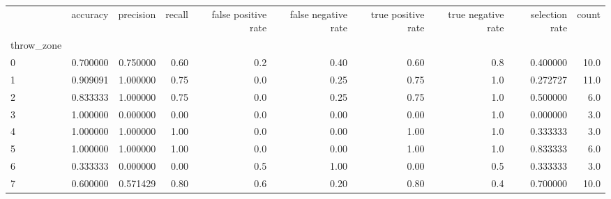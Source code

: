 \begin{tabular}{lrrrrrrrrr}
\toprule
{} &  accuracy &  precision &  recall &  false positive rate &  false negative rate &  true positive rate &  true negative rate &  selection rate &  count \\
throw\_zone &           &            &         &                      &                      &                     &                     &                 &        \\
\midrule
0          &  0.700000 &   0.750000 &    0.60 &                  0.2 &                 0.40 &                0.60 &                 0.8 &        0.400000 &   10.0 \\
1          &  0.909091 &   1.000000 &    0.75 &                  0.0 &                 0.25 &                0.75 &                 1.0 &        0.272727 &   11.0 \\
2          &  0.833333 &   1.000000 &    0.75 &                  0.0 &                 0.25 &                0.75 &                 1.0 &        0.500000 &    6.0 \\
3          &  1.000000 &   0.000000 &    0.00 &                  0.0 &                 0.00 &                0.00 &                 1.0 &        0.000000 &    3.0 \\
4          &  1.000000 &   1.000000 &    1.00 &                  0.0 &                 0.00 &                1.00 &                 1.0 &        0.333333 &    3.0 \\
5          &  1.000000 &   1.000000 &    1.00 &                  0.0 &                 0.00 &                1.00 &                 1.0 &        0.833333 &    6.0 \\
6          &  0.333333 &   0.000000 &    0.00 &                  0.5 &                 1.00 &                0.00 &                 0.5 &        0.333333 &    3.0 \\
7          &  0.600000 &   0.571429 &    0.80 &                  0.6 &                 0.20 &                0.80 &                 0.4 &        0.700000 &   10.0 \\
\bottomrule
\end{tabular}
